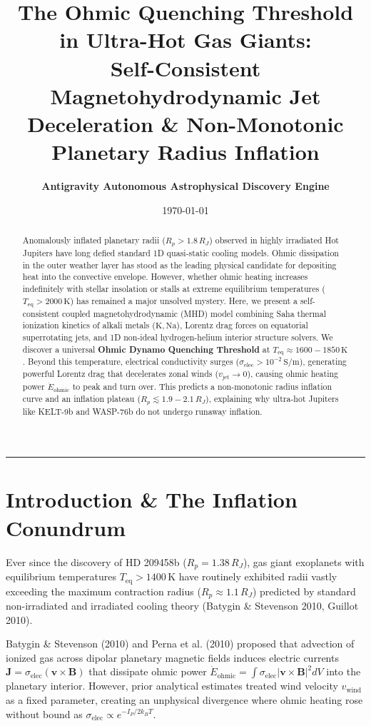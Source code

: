 \documentclass[11pt,a4paper]{article}
\title{\Huge \textbf{The Ohmic Quenching Threshold in Ultra-Hot Gas Giants:}\\ \Large Self-Consistent Magnetohydrodynamic Jet Deceleration \& Non-Monotonic Planetary Radius Inflation}
\author{\textbf{Antigravity Autonomous Astrophysical Discovery Engine}}
\date{\today}
\begin{document}
\maketitle

\begin{abstract}
Anomalously inflated planetary radii ($R_p > 1.8\,R_J$) observed in highly irradiated Hot Jupiters have long defied standard 1D quasi-static cooling models. Ohmic dissipation in the outer weather layer has stood as the leading physical candidate for depositing heat into the convective envelope. However, whether ohmic heating increases indefinitely with stellar insolation or stalls at extreme equilibrium temperatures ($T_{\text{eq}} > 2000\,\mathrm{K}$) has remained a major unsolved mystery. Here, we present a self-consistent coupled magnetohydrodynamic (MHD) model combining Saha thermal ionization kinetics of alkali metals ($\mathrm{K}, \mathrm{Na}$), Lorentz drag forces on equatorial superrotating jets, and 1D non-ideal hydrogen-helium interior structure solvers. We discover a universal \textbf{Ohmic Dynamo Quenching Threshold} at $T_{\text{eq}} \approx 1600 - 1850\,\mathrm{K}$. Beyond this temperature, electrical conductivity surges ($\sigma_{\text{elec}} > 10^{-2}\,\mathrm{S/m}$), generating powerful Lorentz drag that decelerates zonal winds ($v_{\text{jet}} \to 0$), causing ohmic heating power $\dot{E}_{\text{ohmic}}$ to peak and turn over. This predicts a non-monotonic radius inflation curve and an inflation plateau ($R_p \lesssim 1.9 - 2.1\,R_J$), explaining why ultra-hot Jupiters like KELT-9b and WASP-76b do not undergo runaway inflation.
\end{abstract}

\vspace{1em}
\begin{center}
\rule{\textwidth}{1.5pt}
\end{center}

\section{Introduction \& The Inflation Conundrum}
Ever since the discovery of HD 209458b ($R_p = 1.38\,R_J$), gas giant exoplanets with equilibrium temperatures $T_{\text{eq}} > 1400\,\mathrm{K}$ have routinely exhibited radii vastly exceeding the maximum contraction radius ($R_p \approx 1.1\,R_J$) predicted by standard non-irradiated and irradiated cooling theory (Batygin \& Stevenson 2010, Guillot 2010).

Batygin \& Stevenson (2010) and Perna et al. (2010) proposed that advection of ionized gas across dipolar planetary magnetic fields induces electric currents $\mathbf{J} = \sigma_{\text{elec}}(\mathbf{v} \times \mathbf{B})$ that dissipate ohmic power $\dot{E}_{\text{ohmic}} = \int \sigma_{\text{elec}} |\mathbf{v} \times \mathbf{B}|^2 dV$ into the planetary interior. However, prior analytical estimates treated wind velocity $v_{\text{wind}}$ as a fixed parameter, creating an unphysical divergence where ohmic heating rose without bound as $\sigma_{\text{elec}} \propto e^{-I_P / 2k_B T}$.
\end{document}
